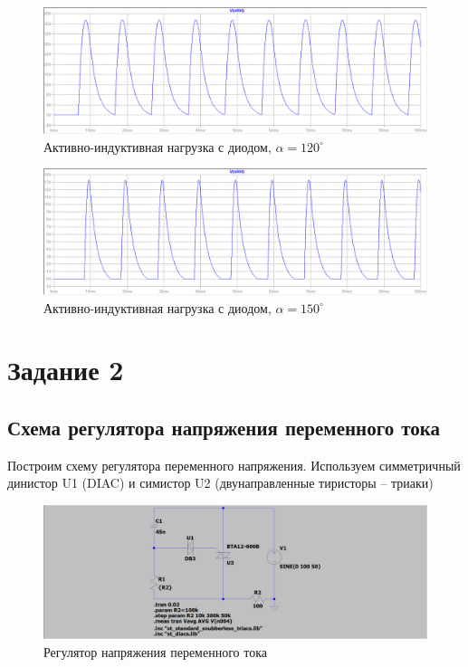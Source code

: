 \documentclass[a4paper, 12pt]{article}
\begin{document}
    \begin{figure}[H]
        \centering
        \includegraphics[scale=0.45]{a120_L20m_D.png}
        \captionsetup{skip=0pt}
        \caption{Активно-индуктивная нагрузка с диодом, $\alpha=120^{\circ}$}
        \label{fig:a120_L20m_D}
    \end{figure}
    \begin{figure}[H]
        \centering
        \includegraphics[scale=0.45]{a150_L20m_D.png}
        \captionsetup{skip=0pt}
        \caption{Активно-индуктивная нагрузка с диодом, $\alpha=150^{\circ}$}
        \label{fig:a150_L20m_D}
    \end{figure}
    \vfill


    \section{Задание 2}
    \subsection{Схема регулятора напряжения переменного тока}
    Построим схему регулятора переменного напряжения. Используем симметричный динистор U1 (DIAC)
    и симистор U2 (двунаправленные тиристоры -- триаки)
    \begin{figure}[H]
        \centering
        \includegraphics[scale=0.22]{scheme4.png}
        \captionsetup{skip=0pt}
        \caption{Регулятор напряжения переменного тока}
        \label{fig:scheme4}
    \end{figure}
\end{document}
